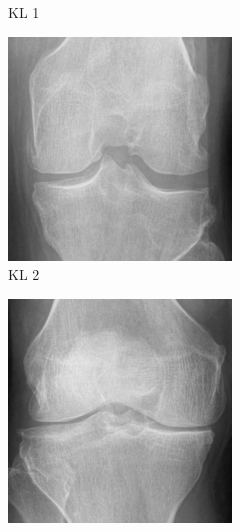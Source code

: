 \documentclass[11pt,spanish,listoffigures,listoftables]{tfgetsinf}
\begin{document}
\begin{figure}[htbp]
\begin{subfigure}[b]{0.19\textwidth}
        \caption{KL 1}
        \label{fig:knee1}
    \end{subfigure}
    \hfill
    \begin{subfigure}[b]{0.19\textwidth}
        \includegraphics[width=\textwidth]{knee_2.png}
        \caption{KL 2}
        \label{fig:knee2}
    \end{subfigure}
    \hfill
    \begin{subfigure}[b]{0.19\textwidth}
        \includegraphics[width=\textwidth]{knee_3.png}

\end{subfigure}
\end{figure}
\end{document}
